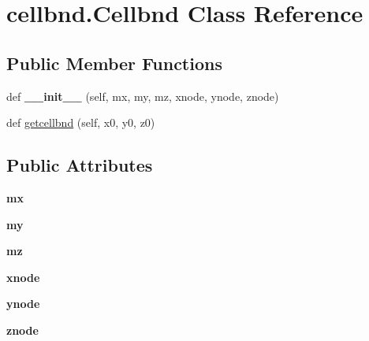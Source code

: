 \hypertarget{classcellbnd_1_1Cellbnd}{}\section{cellbnd.\+Cellbnd Class Reference}
\label{classcellbnd_1_1Cellbnd}
\subsection*{Public Member Functions}
\begin{DoxyCompactItemize}
\item 
\mbox{\label{classcellbnd_1_1Cellbnd_a2d40524f8f7ff6d48aac0d67baea27d0}} 
def {\bfseries \+\_\+\+\_\+init\+\_\+\+\_\+} (self, mx, my, mz, xnode, ynode, znode)
\item 
def \hyperlink{classcellbnd_1_1Cellbnd_ab3da9265f3521355694ad6a1bf33e3f5}{getcellbnd} (self, x0, y0, z0)
\end{DoxyCompactItemize}
\subsection*{Public Attributes}
\begin{DoxyCompactItemize}
\item 
\mbox{\label{classcellbnd_1_1Cellbnd_ac8a2447a78583ac5122fd114541b7f26}} 
{\bfseries mx}
\item 
\mbox{\label{classcellbnd_1_1Cellbnd_a1b8f98f9cc3f1e1366ffb6048aee5195}} 
{\bfseries my}
\item 
\mbox{\label{classcellbnd_1_1Cellbnd_a183609b4e285da3529d8e260b2ea1461}} 
{\bfseries mz}
\item 
\mbox{\label{classcellbnd_1_1Cellbnd_aa10585371b2b91a201b21b38fe8d08fd}} 
{\bfseries xnode}
\item 
\mbox{\label{classcellbnd_1_1Cellbnd_a88c488568d97423298070fd8ae24bf0c}} 
{\bfseries ynode}
\item 
\mbox{\label{classcellbnd_1_1Cellbnd_ad84731834cfe77deb9110ee28b98c169}} 
{\bfseries znode}
\end{DoxyCompactItemize}


